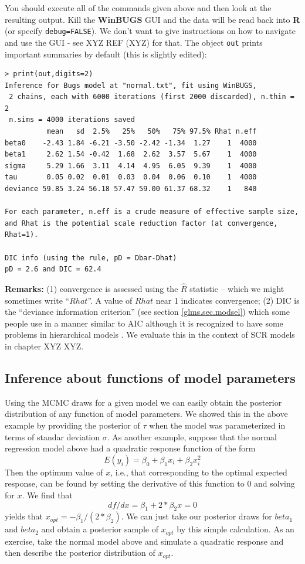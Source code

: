 You should execute all of the commands given above and then look at
the resulting output. Kill the {\bf WinBUGS} GUI and the data will be
read back into {\bf R} (or specify \mbox{\tt debug=FALSE}).  We don't
want to give instructions on how to navigate and use the GUI - see XYZ
REF (XYZ) for that.
The object \mbox{\tt out} prints important
summaries by default (this is slightly edited):

{\small
\begin{verbatim}
> print(out,digits=2)
Inference for Bugs model at "normal.txt", fit using WinBUGS,
 2 chains, each with 6000 iterations (first 2000 discarded), n.thin = 2
 n.sims = 4000 iterations saved
          mean   sd  2.5%   25%   50%   75% 97.5% Rhat n.eff
beta0    -2.43 1.84 -6.21 -3.50 -2.42 -1.34  1.27    1  4000
beta1     2.62 1.54 -0.42  1.68  2.62  3.57  5.67    1  4000
sigma     5.29 1.66  3.11  4.14  4.95  6.05  9.39    1  4000
tau       0.05 0.02  0.01  0.03  0.04  0.06  0.10    1  4000
deviance 59.85 3.24 56.18 57.47 59.00 61.37 68.32    1   840

For each parameter, n.eff is a crude measure of effective sample size,
and Rhat is the potential scale reduction factor (at convergence, Rhat=1).

DIC info (using the rule, pD = Dbar-Dhat)
pD = 2.6 and DIC = 62.4
\end{verbatim}
}

{\bf Remarks:} (1) convergence is assessed using the $\hat{R}$
statistic -- which we might sometimes write ``$Rhat$''. A value of $Rhat$ near 1
indicates convergence; (2) DIC is the
``deviance information criterion'' \citep{spiegelhalter_etal:2002}
(see section \ref{glms.sec.modsel})
 which
some people use in a manner similar to AIC although it is recognized
to have some problems in hierarchical models \citep{millar:2009}. We
evaluate this in the context of SCR models in chapter XYZ XYZ.

\subsection{Inference about functions of model parameters}
\label{glms.sec.xopt}

Using the MCMC draws for a given model we can easily obtain the
posterior distribution of any function of model parameters.  We showed
this in the above example by providing the posterior of $\tau$ when
the model was parameterized in terms of standar deviation $\sigma$.
 As another example, suppose that the
normal regression model above had a quadratic response function of the
form
\[
	E(y_i) = \beta_0 + \beta_1 x_i + \beta_2 x_{i}^{2}
\]
Then the optimum value of $x$, i.e., that corresponding to the optimal
expected response, can be found by setting the derivative of
this function to 0 and solving for $x$. We find that
\[
df/dx = \beta_1 +
2*\beta_2 x = 0
\]
yields that $x_{opt} = -\beta_1/(2*\beta_2)$.  We can just
take our posterior draws for $beta_1$ and $beta_2$ and obtain a
posterior sample of $x_{opt}$ by this simple calculation. As an exercise, take
the normal model above and simulate a quadratic response and then
describe the posterior distribution of $x_{opt}$.


